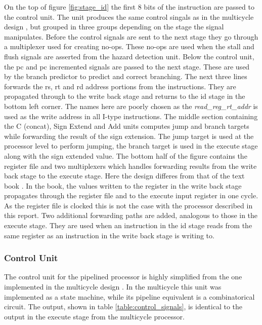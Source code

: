 On the top of figure \ref{fig:stage_id} the first 8 bits of the instruction are passed to the control unit. The unit produces the same control singals as in the multicycle design \cite{multicycle}, but grouped in three groups depending on the stage the signal manipulates. Before the control signals are sent to the next stage they go through a multiplexer used for creating no-ops. These no-ops are used when the stall and flush signals are asserted from the hazard detection unit. Below the control unit, the pc and pc incremented signals are passed to the next stage. These are used by the branch predictor to predict and correct branching. The next three lines forwards the rs, rt and rd address portions from the instructions. They are propagated through to the write back stage and returns to the id stage in the bottom left corner. The names here are poorly chosen as the \emph{read\_reg\_rt\_addr} is used as the write address in all I-type instructions. The middle section containing the C (concat), Sign Extend and Add units computes jump and branch targets while forwarding the result of the sign extension. The jump target is used at the processor level to perform jumping, the branch target is used in the execute stage along with the sign extended value. The bottom half of the figure contains the register file and two multiplexers which handles forwarding results from the write back stage to the execute stage. Here the design differes from that of the text book \cite{curriculum}. In the book, the values written to the register in the write back stage propagates through the register file and to the execute input register in one cycle. As the register file is clocked this is not the case with the processor described in this report. Two additional forwarding paths are added, analogous to those in the execute stage. They are used when an instruction in the id stage reads from the same register as an instruction in the write back stage is writing to.

\subsubsection{Control Unit}
The control unit for the pipelined processor is highly simplified from the one implemented in the multicycle design \cite{multicycle}. In the multicycle this unit was implemented as a state machine, while its pipeline equivalent is a combinatorical circuit. The output, shown in table \ref{table:control_signals}, is identical to the output in the execute stage from the multicycle processor.

